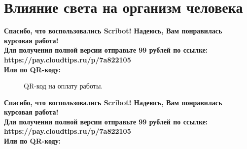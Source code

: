 \documentclass{article}
\begin{document}
\section{Влияние света на организм человека}
\begin{center}
    \textbf{
        Спасибо, что воспользовались Scribot! Надеюсь, Вам понравилась курсовая работа!\\
        Для получения полной версии отправьте 99 рублей по ссылке:\\
        https://pay.cloudtips.ru/p/7a822105\\
        Или по QR-коду:\\
    }
\end{center}
\begin{figure}[h]
    \caption{QR-код на оплату работы.}
    \label{ris:image}
\end{figure}
\newpage
\begin{center}
    \textbf{
        Спасибо, что воспользовались Scribot! Надеюсь, Вам понравилась курсовая работа!\\
        Для получения полной версии отправьте 99 рублей по ссылке:\\
        https://pay.cloudtips.ru/p/7a822105\\
        Или по QR-коду:\\
    }
\end{center}
\end{document}
